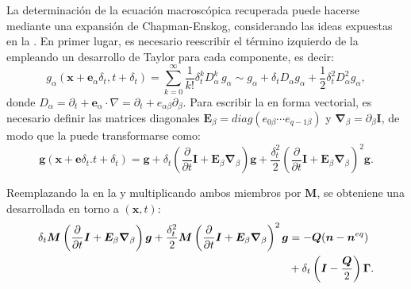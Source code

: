 La determinaci\'on de la ecuaci\'on macrosc\'opica  recuperada puede hacerse mediante una expansi\'on de Chapman-Enskog, considerando las ideas expuestas en la . En primer lugar, es necesario reescribir el t\'ermino izquierdo de la  empleando un desarrollo de Taylor para cada componente, es decir:
\begin{equation}
	g_{\alpha}(\bm{x}+\bm{e}_{\alpha}\delta_t,t+\delta_t) = \sum_{k=0}^{\infty} \dfrac{1}{k!}\delta_t^k D_{\alpha}^{k} \, g_{\alpha} \sim g_{\alpha} + \delta_t D_{\alpha} g_{\alpha} + \dfrac{1}{2}\delta_t^2 D_{\alpha}^2g_{\alpha},
	\label{eq:taylor_gral}
\end{equation}
donde $D_{\alpha} = \partial_t + \bm{e}_{\alpha} \cdot \nabla=\partial_t + e_{\alpha \beta} \partial_{\beta}$. Para escribir la  en forma vectorial, es necesario definir las matrices diagonales $\bm{E}_{\beta} = diag(e_{0\beta} \cdots e_{q-1\beta})$ y $\bm{\nabla}_{\beta} = \partial_{\beta} \bm{I}$, de modo que la  puede transformarse como:
\begin{equation}
	\bm{g}(\bm{x}+\bm{e}\delta_t. t+\delta_t) = \bm{g} 
	+ \delta_t\left( \dfrac{\partial}{\partial t} \bm{I} + \bm{E}_{\beta}\bm{\nabla}_{\beta} \right) \bm{g}
	+ \dfrac{\delta^2_t}{2} \left( \dfrac{\partial}{\partial t} \bm{I} + \bm{E}_{\beta}\bm{\nabla}_{\beta} \right)^2 \bm{g}.
	\label{eq:taylor_vec}
\end{equation}

Reemplazando la  en la  y multiplicando ambos miembros por $\bm{M}$, se obteniene una \lbe{} desarrollada en torno a $(\bm{x},t)$:
\begin{equation}
	\begin{aligned}
	\delta_t \bm{M}\left( \dfrac{\partial}{\partial t} \bm{I} + \bm{E}_{\beta}\bm{\nabla}_{\beta} \right) \bm{g} + \dfrac{\delta^2_t}{2} \bm{M}\left( \dfrac{\partial}{\partial t} \bm{I} + \bm{E}_{\beta}\bm{\nabla}_{\beta} \right)^2 \bm{g} 
	&= -\bm{Q}(\bm{n} - \bm{n}^{eq}) \\
	& + \delta_t \left( \bm{I}-\dfrac{\bm{Q}}{2}\right) \bm{\Gamma}.
	\end{aligned}
	\label{eq:taylor_vec_2}
\end{equation}

